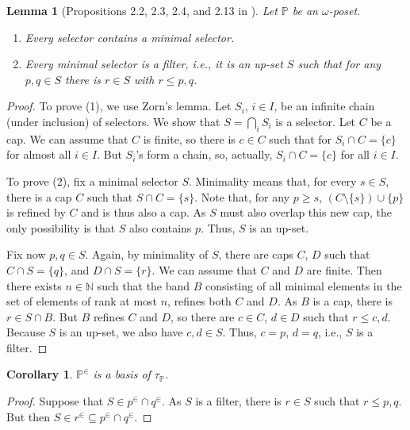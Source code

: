 \documentclass[12pt]{amsart}
\theoremstyle{plain}
\newtheorem{lemma}[theorem]{Lemma}
\newtheorem{corollary}[theorem]{\bf Corollary}
\newcommand \NN{\mathbb{N}}
\newcommand \PPb{\mathbb{P}}
\begin{document}
	\begin{lemma}[Propositions 2.2, 2.3, 2.4, and 2.13 in \cite{BaBiVi}]
		\label{le:SelectorFilterAndContainsMin}
		Let $\PPb$ be an  $\omega$-poset.
		\begin{enumerate}
			\item Every selector contains a minimal selector.
			\item Every minimal selector is a filter, i.e., it is an up-set $S$ such that for any $p,q \in S$ there is $r \in S$ with $r \leq p,q$.
		\end{enumerate}
	\end{lemma} 
	
\begin{proof}
To prove (1), we use Zorn's lemma. Let $S_i$, $i \in I$, be an infinite chain (under inclusion) of selectors. We show that $S= \bigcap_i S_i$ is a selector. Let $C$ be a cap. We can assume that $C$ is finite, so there is $c \in C$ such that for $S_i \cap C=\{c\}$ for almost all $i \in I$. But $S_i$'s form a chain, so, actually, $S_i \cap C=\{c\}$ for all $i \in I$.

To prove (2), fix a minimal selector $S$. Minimality means that, for every $s \in  S$, there is a cap $C$ such that $S \cap  C= \{s\}$. Note that, for any $p \geq s$, $(C \setminus \{s\}) \cup \{p\}$ is refined by $C$ and is thus also a cap. As $S$ must also overlap this new cap, the only possibility is that $S$ also contains $p$. Thus, $S$ is an up-set.  

Fix now $p,q \in S$. Again, by minimality of $S$, there are caps $C$, $D$ such that $C \cap S= \{q\}$, and $D\cap S= \{r\}$. We can assume that $C$ and $D$ are finite. Then there exists $n \in \NN$ such that the band $B$ consisting of all minimal elements in the set of elements of rank at most $n$, refines both $C$ and $D$. As $B$ is a cap, there is $r \in S \cap B$. But $B$ refines $C$ and $D$, so there are $c \in C$, $d \in D$ such that $r \leq c,d$. Because $S$ is an up-set, we also have $c,d \in S$. Thus, $c=p$, $d=q$, i.e., $S$ is a filter.
\end{proof}
	
	\begin{corollary}
		$\PPb^\in$ is a basis of $\tau_\PPb$.
	\end{corollary}
	
	\begin{proof}
		Suppose that $S \in p^\in \cap q^\in$. As $S$ is a filter, there is $r \in S$ such that $r \leq p,q$. But then $S \in r^\in \subseteq p^\in \cap q^\in$.
	\end{proof}
	
\end{document}

